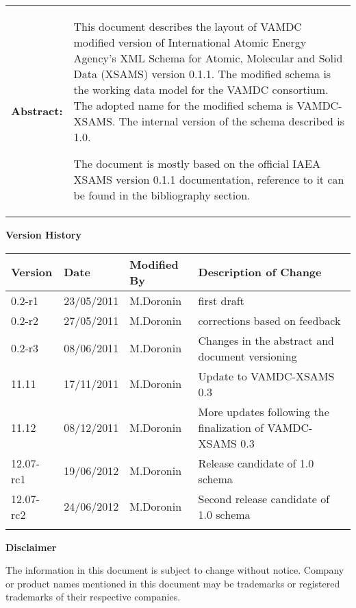 {\begin{titlepage}
\noindent \begin{tabular}{p{1.7in}p{4.3in}}

\textbf{Abstract:} & 
This document describes the layout of VAMDC modified version of
International Atomic Energy Agency's XML Schema for Atomic, Molecular and Solid Data (XSAMS) version 0.1.1.
The modified schema is the working data model for the VAMDC consortium.
The adopted name for the modified schema is VAMDC-XSAMS.
The internal version of the schema described is 1.0.

The document is mostly based on the official IAEA XSAMS version 0.1.1 documentation, reference to it can be found
in the bibliography section.
\end{tabular}



\end{titlepage}

\noindent \textbf{Version History}

\textbf{}

\noindent \begin{tabular}{|l|l|l|l|} 
\hline 
\textbf{Version} & \textbf{Date} & \textbf{Modified By} & \textbf{Description of Change} \\ \hline 
0.2-r1	& 23/05/2011 & M.Doronin & first draft \\ \hline 
0.2-r2	& 27/05/2011 & M.Doronin & corrections based on feedback \\ \hline 
0.2-r3	& 08/06/2011 & M.Doronin & Changes in the abstract and document versioning \\ \hline 
11.11 	& 17/11/2011 & M.Doronin & Update to VAMDC-XSAMS 0.3 \\ \hline 
11.12 	& 08/12/2011 & M.Doronin & More updates following the finalization of VAMDC-XSAMS 0.3 \\ \hline 
12.07-rc1 & 19/06/2012 & M.Doronin & Release candidate of 1.0 schema \\ \hline 
12.07-rc2 & 24/06/2012 & M.Doronin & Second release candidate of 1.0 schema \\ \hline
 &  &  &  \\ \hline 
\end{tabular}

\textbf{}

\noindent \textbf{Disclaimer}

\noindent The information in this document is subject to change without notice. Company or product names mentioned in this document may be trademarks or registered trademarks of their respective companies.


}
